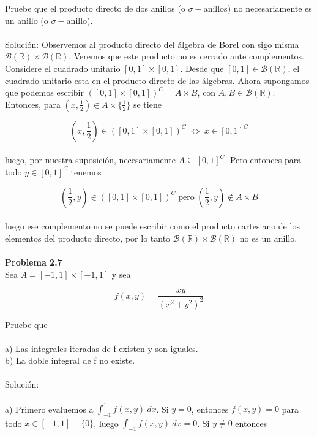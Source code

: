 \documentclass[12pt]{article}
\begin{document}
    Pruebe que el producto directo de dos anillos (o $\sigma-$anillos) no necesariamente es un 
    anillo (o $\sigma-$anillo).
    \\ \\
    Soluci\'on:
    Observemos al producto directo del \'algebra de Borel con sigo misma $\mathscr{B}(\mathbb{R}) \times \mathscr{B}(\mathbb{R})$. 
    Veremos que este producto no es cerrado ante complementos. \\
    Considere el cuadrado unitario $[0,1]\times [0,1]$. Desde que $[0,1]\in \mathscr{B}(\mathbb{R})$,
    el cuadrado unitario esta en el producto directo de las \'algebras. Ahora supongamos que podemos
    escribir $([0,1]\times [0,1])^C=A\times B$, con $A,B\in \mathscr{B}(\mathbb{R})$. Entonces, para  
      $(x,\frac{1}{2})\in A\times \{\frac{1}{2}\}$ se tiene 

    \[\left(x,\frac{1}{2}\right)\in ([0,1]\times [0,1])^C \; \Longleftrightarrow \; x\in [0,1]^C\]
    \\
    luego, por nuestra suposici\'on, necesariamente $A\subseteq [0,1]^C$. Pero entonces para todo $y\in [0,1]^C$ tenemos

    \[\left(\frac{1}{2},y\right)\in ([0,1]\times [0,1])^C \; \mathrm{pero} \; \left(\frac{1}{2},y\right)\notin A\times B \]
    \\
    luego ese complemento no se puede escribir como el producto cartesiano de los elementos del 
    producto directo, por lo tanto $\mathscr{B}(\mathbb{R}) \times \mathscr{B}(\mathbb{R})$ no 
    es un anillo. \\ \\

    \textbf{Problema 2.7} \\

    Sea $A=[-1,1]\times [-1,1]$ y sea 

    \[f(x,y)=\frac{xy}{(x^2+y^2)^2}\]

    Pruebe que \\ \\
    a) Las integrales iteradas de f existen y son iguales. \\
    b) La doble integral de f no existe.
    \\ \\
    Soluci\'on: 
    \\ \\
    a) Primero evaluemos a $\int_{-1}^{1}f(x,y)\:dx$. Si $y=0$, entonces $f(x,y)=0$ para todo 
    $x\in [-1,1]-\{0\}$, luego $\int_{-1}^{1}f(x,y)\:dx=0$. Si $y\neq 0$ entonces
\end{document}
